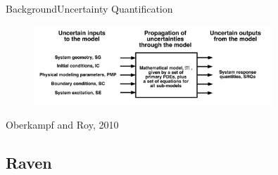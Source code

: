 \documentclass{beamer}
\begin{document}
\begin{frame}{Background}{Uncertainty Quantification}
  \vspace{-20pt}
  \begin{figure}[h!]
    \centering
      \includegraphics[width=0.8\textwidth]{../../graphics/v_and_v_uq}
  \end{figure}
  \hfill Oberkampf and Roy, 2010
\end{frame}


\subsection{Raven}
\end{document}
